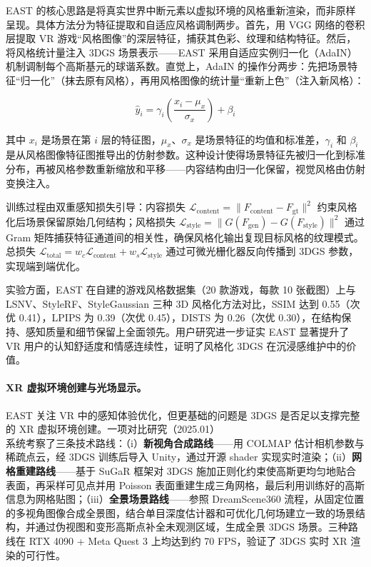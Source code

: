 EAST 的核心思路是将真实世界中断元素以虚拟环境的风格重新渲染，而非原样呈现。具体方法分为特征提取和自适应风格调制两步。首先，用 VGG 网络的卷积层提取 VR 游戏“风格图像”的深层特征，捕获其色彩、纹理和结构特征。然后，将风格统计量注入 3DGS 场景表示——EAST 采用自适应实例归一化（AdaIN）机制调制每个高斯基元的球谐系数。直觉上，AdaIN 的操作分两步：先把场景特征“归一化”（抹去原有风格），再用风格图像的统计量“重新上色”（注入新风格）：

\begin{equation}
\hat{y}_i = \gamma_i \left(\frac{x_i - \mu_x}{\sigma_x}\right) + \beta_i
\end{equation}

其中 $x_i$ 是场景在第 $i$ 层的特征图，$\mu_x$、$\sigma_x$ 是场景特征的均值和标准差，$\gamma_i$ 和 $\beta_i$ 是从风格图像特征图推导出的仿射参数。这种设计使得场景特征先被归一化到标准分布，再被风格参数重新缩放和平移——内容结构由归一化保留，视觉风格由仿射变换注入。

训练过程由双重感知损失引导：内容损失 $\mathcal{L}_{\text{content}} = \|F_{\text{content}} - F_{\text{gt}}\|^2$ 约束风格化后场景保留原始几何结构；风格损失 $\mathcal{L}_{\text{style}} = \|G(F_{\text{gen}}) - G(F_{\text{style}})\|^2$ 通过 Gram 矩阵捕获特征通道间的相关性，确保风格化输出复现目标风格的纹理模式。总损失 $\mathcal{L}_{\text{total}} = w_c \mathcal{L}_{\text{content}} + w_s \mathcal{L}_{\text{style}}$ 通过可微光栅化器反向传播到 3DGS 参数，实现端到端优化。

实验方面，EAST 在自建的游戏风格数据集（20 款游戏，每款 10 张截图）上与 LSNV、StyleRF、StyleGaussian 三种 3D 风格化方法对比，SSIM 达到 0.55（次优 0.41），LPIPS 为 0.39（次优 0.45），DISTS 为 0.26（次优 0.30），在结构保持、感知质量和细节保留上全面领先。用户研究进一步证实 EAST 显著提升了 VR 用户的认知舒适度和情感连续性，证明了风格化 3DGS 在沉浸感维护中的价值。

\paragraph{XR 虚拟环境创建与光场显示。}

EAST 关注 VR 中的感知体验优化，但更基础的问题是 3DGS 是否足以支撑完整的 XR 虚拟环境创建。一项对比研究（2025.01）~\cite{2501_09302} 系统考察了三条技术路线：（i）\textbf{新视角合成路线}——用 COLMAP 估计相机参数与稀疏点云，经 3DGS 训练后导入 Unity，通过开源 shader 实现实时渲染；（ii）\textbf{网格重建路线}——基于 SuGaR 框架对 3DGS 施加正则化约束使高斯更均匀地贴合表面，再采样可见点并用 Poisson 表面重建生成三角网格，最后利用训练好的高斯信息为网格贴图；（iii）\textbf{全景场景路线}——参照 DreamScene360 流程，从固定位置的多视角图像合成全景图，结合单目深度估计器和可优化几何场建立一致的场景结构，并通过伪视图和变形高斯点补全未观测区域，生成全景 3DGS 场景。三种路线在 RTX 4090 + Meta Quest 3 上均达到约 70 FPS，验证了 3DGS 实时 XR 渲染的可行性。

